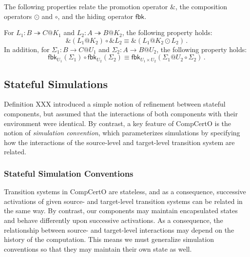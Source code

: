 \documentclass[acmsmall,screen,review,anonymous]{acmart}
\newcommand{\kw}[1]{\ensuremath{ \mathsf{#1} }}
\begin{document}
The following properties
relate the promotion operator $\&$,
the composition operators $\odot$ and $\circ$,
and the hiding operator $\kw{fbk}$.

\begin{lemma}
  For $L_1 : B \twoheadrightarrow C@K_1$ and
  $L_2 : A \twoheadrightarrow B@K_2$,
  the following property holds:
  \[
    \&(L_1@K_2) \circ \&L_2 \equiv \&(L_1@K_2 \odot L_2)
    \,.
  \]
  In addition, for $\Sigma_1 : B \rightarrow C@U_1$
  and $\Sigma_2 : A \rightarrow B@U_2$,
  the following property holds:
  \[
    \kw{fbk}_{U_1}(\Sigma_1) \circ \kw{fbk}_{U_2}(\Sigma_2) \equiv
    \kw{fbk}_{U_1 \times U_2}(\Sigma_1@U_2 \circ \Sigma_2)
    \,.
  \]
\end{lemma}


\subsection{Stateful Simulations} %

Definition XXX introduced a simple notion of refinement
between stateful components,
but assumed that the interactions of both components
with their environment were identical.
By contrast, a key feature of CompCertO
is the notion of \emph{simulation convention},
which parameterizes simulations by
specifying how the interactions of
the source-level and target-level transition system
are related.

\subsubsection{Stateful Simulation Conventions} %

Transition systems in CompCertO are stateless,
and as a consequence,
successive activations of given
source- and target-level
transition systems can be related in the same way.
By contrast,
our components may maintain encapsulated states
and behave differently upon successive activations.
As a consequence,
the relationship between source- and target-level interactions
may depend on the history of the computation.
This means we must generalize simulation conventions
so that they may maintain their own state as well.
\end{document}
